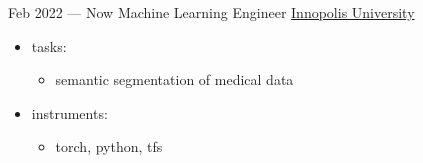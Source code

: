 \documentclass[letterpaper]{twentysecondcv} %
\begin{document}
\begin{twenty} %
        \twentyitem
        {Feb 2022 —}
        {Now}
        {Machine Learning Engineer}
        {  \href{https://https://innopolis.university/en/}{Innopolis University}}
        {}
        {
        {\begin{itemize}
            \item tasks:
            {\begin{itemize}
                \item semantic segmentation of medical data
            \end{itemize}}
            \item instruments:
            {\begin{itemize}
                \item torch, python, tfs
            \end{itemize}
            }

        \end{itemize}}
        }
        \\


\end{twenty}
\end{document}
